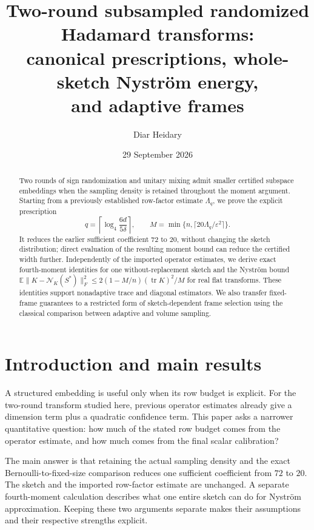 \documentclass[11pt,a4paper]{article}
\title{Two-round subsampled randomized Hadamard transforms:\\
canonical prescriptions, whole-sketch Nystr\"om energy,\\
and adaptive frames}
\author{Diar Heidary}
\date{29 September 2026}
\theoremstyle{definition}
\theoremstyle{remark}
\numberwithin{equation}{section}
\newcommand{\E}{\mathbb E}
\newcommand{\tr}{\operatorname{tr}}
\begin{document}
\maketitle

\begin{abstract}
Two rounds of sign randomization and unitary mixing admit smaller certified
subspace embeddings when the sampling density is retained throughout the
moment argument. Starting from a previously established row-factor estimate
$\Lambda_q$, we prove the explicit prescription
\[
 q=\left\lceil\log_4\frac{6d}{5\delta}\right\rceil,
 \qquad M=\min\{n,\lceil20\Lambda_q/\varepsilon^2\rceil\}.
\]
It reduces the earlier sufficient coefficient $72$ to $20$, without changing
the sketch distribution; direct evaluation of the resulting moment bound
can reduce the certified width further. Independently of the imported
operator estimates, we derive exact fourth-moment identities for one
without-replacement sketch and the Nystr\"om bound
$\E\|K-\mathcal N_K(S^*)\|_F^2\le
2(1-M/n)(\tr K)^2/M$ for real flat transforms. These identities support
nonadaptive trace and diagonal estimators. We also transfer fixed-frame
guarantees to a restricted form of sketch-dependent frame selection using
the classical comparison between adaptive and volume sampling.
\end{abstract}

\tableofcontents

\section{Introduction and main results}\label{sec:intro}

A structured embedding is useful only when its row budget is explicit.
For the two-round transform studied here, previous operator estimates
already give a dimension term plus a quadratic confidence term. This paper
asks a narrower quantitative question: how much of the stated row budget
comes from the operator estimate, and how much comes from the final scalar
calibration?

The main answer is that retaining the actual sampling density and the exact
Bernoulli-to-fixed-size comparison reduces one sufficient coefficient from
$72$ to $20$. The sketch and the imported row-factor estimate are unchanged.
A separate fourth-moment calculation describes what one entire sketch can
do for Nystr\"om approximation. Keeping these two arguments separate makes
their assumptions and their respective strengths explicit.
\end{document}
